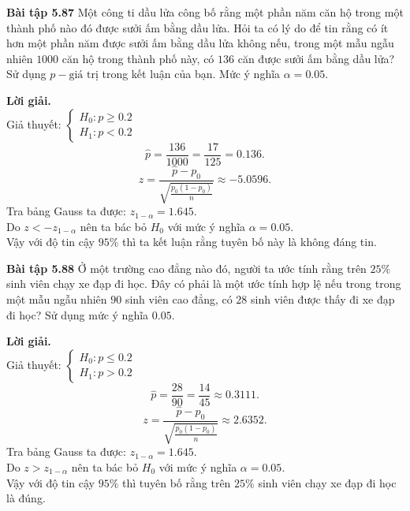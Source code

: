 \begin{mybox}
\textbf{Bài tập 5.87} Một công ti dầu lửa công bố rằng một phần năm căn hộ trong một thành phố nào đó được sưởi ấm bằng dầu lửa. Hỏi ta có lý do để tin rằng có ít hơn một phần năm được sưởi ấm bằng dầu lửa không nếu, trong một mẫu ngẫu nhiên $1000$ căn hộ trong thành phố này, có $136$ căn được sưởi ấm bằng dầu lửa? Sử dụng $p-\text{giá trị}$ trong kết luận của bạn. Mức ý nghĩa $\alpha = 0.05.$
\end{mybox}
\textbf{Lời giải.}\\
Giả thuyết: $\begin{cases}
H_0: p \geqslant 0.2\\
H_1: p < 0.2
\end{cases}$\\
$$\widehat{p} = \frac{136}{1000} = \frac{17}{125} = 0.136.$$
$$z = \frac{{\widehat p - {p_0}}}{{\sqrt {\frac{{{p_0}\left( {1 - {p_0}} \right)}}{n}} }} \approx -5.0596.$$
Tra bảng Gauss ta được: $z_{1 - \alpha} = 1.645.$\\
Do $z < - z_{1 - \alpha}$ nên ta bác bỏ $H_0$ với mức ý nghĩa $\alpha = 0.05.$\\
Vậy với độ tin cậy $95\%$ thì ta kết luận rằng tuyên bố này là không đáng tin.

\begin{mybox}
\textbf{Bài tập 5.88} Ở một trường cao đẳng nào đó, người ta ước tính rằng trên $25\%$ sinh viên chạy xe đạp đi học. Đây có phải là một ước tính hợp lệ nếu trong trong một mẫu ngẫu nhiên $90$ sinh viên cao đẳng, có $28$ sinh viên được thấy đi xe đạp đi học? Sử dụng mức ý nghĩa $0.05.$
\end{mybox}
\textbf{Lời giải.}\\
Giả thuyết: $\begin{cases}
H_0: p \leqslant 0.2\\
H_1: p > 0.2
\end{cases}$\\
$$\widehat{p} = \frac{28}{90} = \frac{14}{45} \approx 0.3111.$$
$$z = \frac{{\widehat p - {p_0}}}{{\sqrt {\frac{{{p_0}\left( {1 - {p_0}} \right)}}{n}} }} \approx 2.6352.$$
Tra bảng Gauss ta được: $z_{1 - \alpha} = 1.645.$\\
Do $z > z_{1 - \alpha}$ nên ta bác bỏ $H_0$ với mức ý nghĩa $\alpha = 0.05.$\\
Vậy với độ tin cậy $95\%$ thì tuyên bố rằng trên $25\%$ sinh viên chạy xe đạp đi học là đúng.